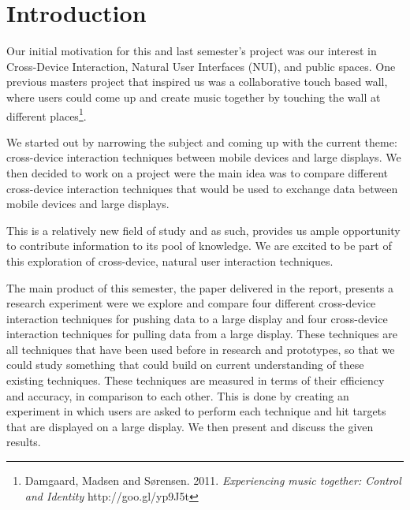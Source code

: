 \section*{Introduction}\label{sec:introduction}
Our initial motivation for this and last semester's project was our interest in Cross-Device Interaction, Natural User Interfaces (NUI), and public spaces.
One previous masters project that inspired us was a collaborative touch based wall, where users could come up and create music together by touching the wall at different places\footnote{Damgaard, Madsen and Sørensen. 2011. \textit{Experiencing music together: Control and Identity} http://goo.gl/yp9J5t}.

We started out by narrowing the subject and coming up with the current theme: cross-device interaction techniques between mobile devices and large displays. 
We then decided to work on a project were the main idea was to compare different cross-device interaction techniques that would be used to exchange data between mobile devices and large displays. 

This is a relatively new field of study and as such, provides us ample opportunity to contribute information to its pool of knowledge. 
We are excited to be part of this exploration of cross-device, natural user interaction techniques. 

The main product of this semester, the paper delivered in the report, presents a research experiment were we explore and compare four different cross-device interaction techniques for pushing data to a large display and four cross-device interaction techniques for pulling data from a large display. 
These techniques are all techniques that have been used before in research and prototypes, so that we could study something that could build on current understanding of these existing techniques.
These techniques are measured in terms of their efficiency and accuracy, in comparison to each other.
This is done by creating an experiment in which users are asked to perform each technique and hit targets that are displayed on a large display.
We then present and discuss the given results. 